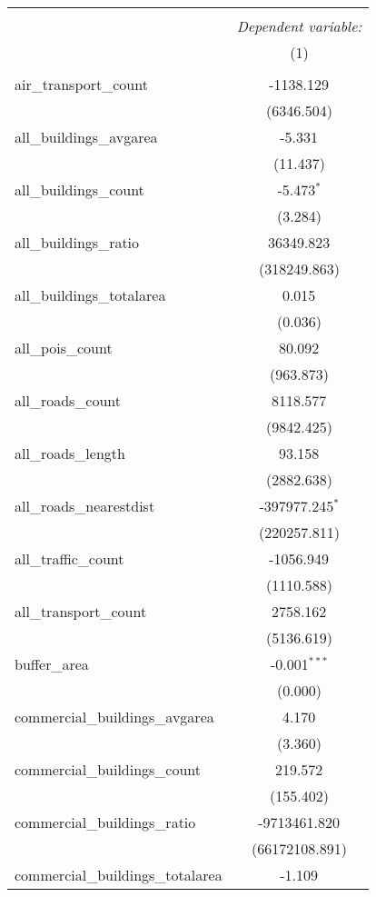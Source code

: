 \begin{table}[!htbp] \centering
\begin{tabular}{@{\extracolsep{5pt}}lc}
\\[-1.8ex]\hline
\hline \\[-1.8ex]
& \multicolumn{1}{c}{\textit{Dependent variable:}} \
\cr \cline{1-2}
\\[-1.8ex] & (1) \\
\hline \\[-1.8ex]
 air_transport_count & -1138.129$^{}$ \\
  & (6346.504) \\
 all_buildings_avgarea & -5.331$^{}$ \\
  & (11.437) \\
 all_buildings_count & -5.473$^{*}$ \\
  & (3.284) \\
 all_buildings_ratio & 36349.823$^{}$ \\
  & (318249.863) \\
 all_buildings_totalarea & 0.015$^{}$ \\
  & (0.036) \\
 all_pois_count & 80.092$^{}$ \\
  & (963.873) \\
 all_roads_count & 8118.577$^{}$ \\
  & (9842.425) \\
 all_roads_length & 93.158$^{}$ \\
  & (2882.638) \\
 all_roads_nearestdist & -397977.245$^{*}$ \\
  & (220257.811) \\
 all_traffic_count & -1056.949$^{}$ \\
  & (1110.588) \\
 all_transport_count & 2758.162$^{}$ \\
  & (5136.619) \\
 buffer_area & -0.001$^{***}$ \\
  & (0.000) \\
 commercial_buildings_avgarea & 4.170$^{}$ \\
  & (3.360) \\
 commercial_buildings_count & 219.572$^{}$ \\
  & (155.402) \\
 commercial_buildings_ratio & -9713461.820$^{}$ \\
  & (66172108.891) \\
 commercial_buildings_totalarea & -1.109$^{}$ \\

\end{tabular}
\end{table}
